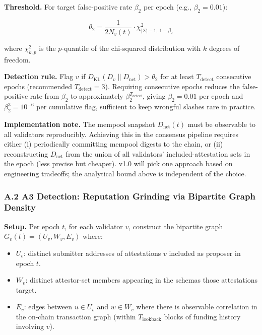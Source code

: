 \documentclass[
  11pt,
]{article}
\providecommand{\tightlist}{%
  \setlength{\itemsep}{0pt}\setlength{\parskip}{0pt}}
\begin{document}
\textbf{Threshold.} For target false-positive rate \(\beta_2\) per epoch
(e.g., \(\beta_2 = 0.01\)):

\[\theta_2 = \frac{1}{2 N_v(t)} \cdot \chi^2_{|\Sigma|-1,\ 1-\beta_2}\]

where \(\chi^2_{k, p}\) is the \(p\)-quantile of the chi-squared
distribution with \(k\) degrees of freedom.

\textbf{Detection rule.} Flag \(v\) if
\(D_{\text{KL}}(D_v \| D_{\text{net}}) > \theta_2\) for at least
\(T_{\text{detect}}\) consecutive epochs (recommended
\(T_{\text{detect}} = 3\)). Requiring consecutive epochs reduces the
false-positive rate from \(\beta_2\) to approximately
\(\beta_2^{T_{\text{detect}}}\), giving \(\beta_2 = 0.01\) per epoch and
\(\beta_2^3 = 10^{-6}\) per cumulative flag, sufficient to keep wrongful
slashes rare in practice.

\textbf{Implementation note.} The mempool snapshot \(D_{\text{net}}(t)\)
must be observable to all validators reproducibly. Achieving this in the
consensus pipeline requires either (i) periodically committing mempool
digests to the chain, or (ii) reconstructing \(D_{\text{net}}\) from the
union of all validators' included-attestation sets in the epoch (less
precise but cheaper). v1.0 will pick one approach based on engineering
tradeoffs; the analytical bound above is independent of the choice.

\subsubsection{A.2 A3 Detection: Reputation Grinding via Bipartite Graph
Density}\label{a.2-a3-detection-reputation-grinding-via-bipartite-graph-density}

\textbf{Setup.} Per epoch \(t\), for each validator \(v\), construct the
bipartite graph \(G_v(t) = (U_v, W_v, E_v)\) where:

\begin{itemize}
\tightlist
\item
  \(U_v\): distinct submitter addresses of attestations \(v\) included
  as proposer in epoch \(t\).
\item
  \(W_v\): distinct attestor-set members appearing in the schemas those
  attestations target.
\item
  \(E_v\): edges between \(u \in U_v\) and \(w \in W_v\) where there is
  observable correlation in the on-chain transaction graph (within
  \(T_{\text{lookback}}\) blocks of funding history involving \(v\)).
\end{itemize}
\end{document}
